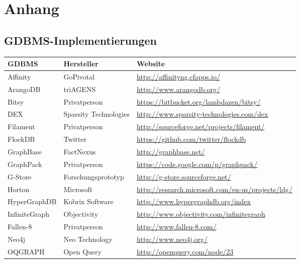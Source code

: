 \chapter{Anhang }
\label{cha:Anhang}

\section{GDBMS-Implementierungen}
\label{anh:vendor_list}

\renewcommand{\arraystretch}{1.25}
\begin{table}[h]
	\centering
	\begin{footnotesize}
   	\begin{tabular}{|m{2.5cm}|m{3.5cm}|>{\arraybackslash}m{9.25cm}|}
	\hline	
	\textbf{GDBMS} & \textbf{Hersteller} & \textbf{Website} \\
	\hline
   	Affinity 		& GoPivotal 			& \url{http://affinityng.cfapps.io/} \\
   	ArangoDB 		& triAGENS 				& \url{http://www.arangodb.org/} \\
   	Bitsy 			& Privatperson 			& \url{https://bitbucket.org/lambdazen/bitsy/} \\
   	DEX 			& Sparsity Technologies & \url{http://www.sparsity-technologies.com/dex} \\
   	Filament 		& Privatperson 			& \url{http://sourceforge.net/projects/filament/} \\
   	FlockDB 		& Twitter				& \url{https://github.com/twitter/flockdb} \\
   	GraphBase 		& FactNexus 			& \url{http://graphbase.net/} \\
   	GraphPack 		& Privatperson 			& \url{https://code.google.com/p/graphpack/} \\
   	G-Store 		& Forschungsprototyp	& \url{http://g-store.sourceforge.net/} \\
   	Horton 			& Microsoft 			& \url{http://research.microsoft.com/en-us/projects/ldg/} \\
   	HyperGraphDB 	& Kobrix Software		& \url{http://www.hypergraphdb.org/index} \\
   	InfiniteGraph 	& Objectivity			& \url{http://www.objectivity.com/infinitegraph} \\
   	Fallen-8 		& Privatperson 			& \url{http://www.fallen-8.com/} \\
   	Neo4j 			& Neo Technology 		& \url{http://www.neo4j.org/} \\
   	OQGRAPH 		& Open Query 			& \url{http://openquery.com/node/23} \\

\end{tabular}
\end{footnotesize}
\end{table}

